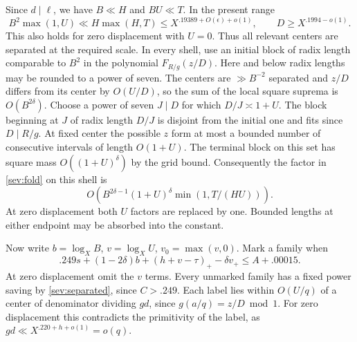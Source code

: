 \documentclass[11pt,a4paper]{article}
\theoremstyle{paperplain}
\numberwithin{equation}{section}
\begin{document}
Since $d\mid\ell$, we have $B\ll H$ and $BU\ll T$.
In the present range
\[
 B^2\max(1,U)\ll H\max(H,T)\le
 X^{.19389+O(\epsilon)+o(1)},\qquad
 D\ge X^{.1994-o(1)} .
\]
This also holds for zero displacement with $U=0$. Thus all
relevant centers are separated at the required scale.
In every shell,
use an initial block of radix length comparable to $B^2$ in the
polynomial $F_{R/g}(z/D)$. Here and below radix lengths may be
rounded to a power of seven. The centers are $\gg B^{-2}$ separated
and $z/D$ differs from its center by $O(U/D)$, so the sum of the
local square suprema is $O(B^{2\delta})$. Choose a power of seven
$J\mid D$ for which $D/J\asymp1+U$. The block beginning at $J$ of
radix length $D/J$ is disjoint from the initial one and fits since
$D\mid R/g$. At fixed center the possible $z$ form at most a bounded
number of consecutive intervals of length $O(1+U)$. The terminal
block on this set has square mass $O((1+U)^\delta)$ by the grid bound.
Consequently the factor in \eqref{sev:fold} on this shell is
\begin{equation}
 O(B^{2\delta-1}(1+U)^\delta\min(1,T/(HU))).
 \label{sev:separated}
\end{equation}
At zero displacement both $U$ factors are replaced by one.
Bounded lengths at either endpoint may be absorbed into the constant.

Now write $b=\log_X B$, $v=\log_X U$,
$v_0=\max(v,0)$. Mark a family when
\begin{equation}
 .249s+(1-2\delta)b+(h+v-\tau)_+-\delta v_+
                 \le A+.00015 .
 \label{sev:active}
\end{equation}
At zero displacement omit the $v$ terms. Every unmarked family has
a fixed power saving by \eqref{sev:separated}, since $C>.249$.
Each label lies within $O(U/q)$ of a center of denominator
dividing $gd$, since $g(a/q)=z/D\bmod 1$. For zero displacement
this contradicts the primitivity of the label, as $gd\ll
X^{.220+h+o(1)}=o(q)$.
\end{document}
